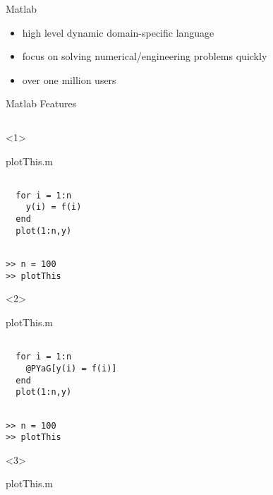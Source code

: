 
\begin{frame}{Matlab}


\begin{itemize}
\pause \item high level dynamic domain-specific language
\pause \item focus on solving numerical/engineering problems quickly
\pause \item over one million users
\end{itemize}

\end{frame}
\begin{frame}[fragile]{Matlab Features}
  \begin{columns}
    \begin{column}[T]{5cm}
      \begin{onlyenv}<1>
        \begin{block}{plotThis.m}
          \begin{Verbatim}[commandchars=@\[\]]

  for i = 1:n
    y(i) = f(i)
  end
  plot(1:n,y)
          \end{Verbatim}
        \end{block}
          \begin{Verbatim}[commandchars=@\[\]]

>> n = 100
>> plotThis
        \end{Verbatim}
      \end{onlyenv}
      \begin{onlyenv}<2>
        \begin{block}{plotThis.m}
          \begin{Verbatim}[commandchars=@\[\]]

  for i = 1:n
    @PYaG[y(i) = f(i)]
  end
  plot(1:n,y)
          \end{Verbatim}
        \end{block}
          \begin{Verbatim}[commandchars=@\[\]]

>> n = 100
>> plotThis
        \end{Verbatim}
      \end{onlyenv}
      \begin{onlyenv}<3>
        \begin{block}{plotThis.m}
          \begin{Verbatim}[commandchars=@\[\]]


\end{Verbatim}
\end{block}
\end{onlyenv}
\end{column}
\end{columns}
\end{frame}
